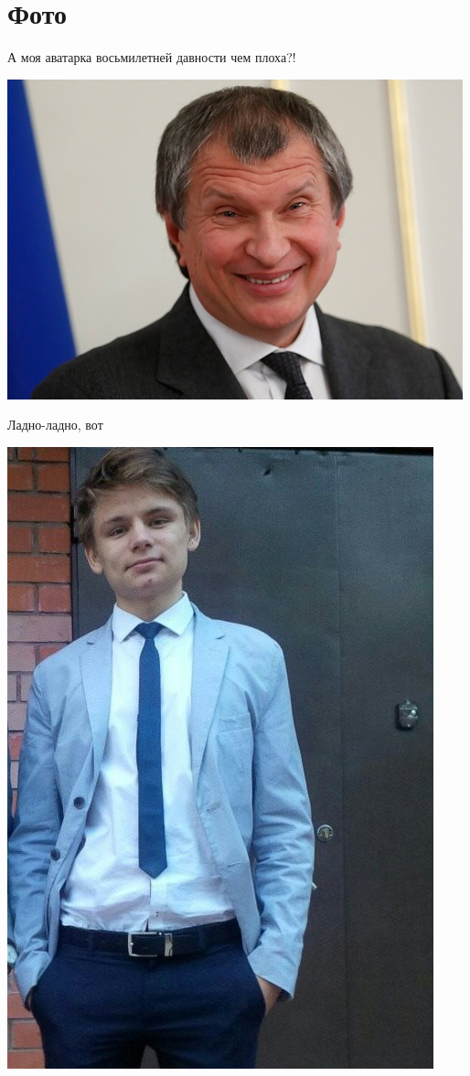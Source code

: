 \documentclass[12pt,a4paper]{article}
\begin{document}
\section{Фото}
А моя аватарка восьмилетней давности чем плоха?!
 \begin{center}
 	\includegraphics[scale=0.6]{sechin1.jpg}
 \end{center}
Ладно-ладно, вот \\
\begin{center}
\includegraphics[scale=0.5]{Durov.jpg}
\end{center}
\end{document}
